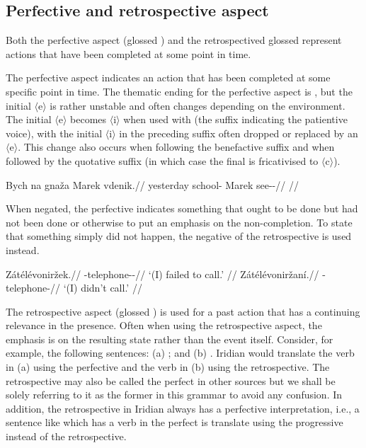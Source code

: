 \subsection{Perfective and retrospective aspect}\label{sec:perfective-retrospective}

Both the perfective aspect (glossed \Pf{}) and the retrospectived {glossed \Ret{}} represent actions that have been completed at some point in time.

The perfective aspect indicates an action that has been completed at some specific point in time. The thematic ending for the perfective aspect is , but the initial $\langle$e$\rangle$ is rather unstable and often changes depending on the environment. The initial $\langle$e$\rangle$ becomes $\langle$i$\rangle$ when used with  (the suffix indicating the patientive voice), with the initial $\langle$i$\rangle$ in the preceding suffix often dropped or replaced by an $\langle$e$\rangle$. This change also occurs when following the benefactive suffix  and when followed by the quotative suffix  (in which case the final  is fricativised to $\langle$c$\rangle$).

\pex
\begingl
\gla Bych na gnaža Marek vdenik.//
\glb yesterday \Loc{} school-\Acc{} Marek see-\Pv{}-\Pf{}//
\glft {}//
\endgl
\xe

When negated, the perfective indicates something that ought to be done but had not been done or otherwise to put an emphasis on the non-completion. To state that something simply did not happen, the negative of the retrospective is used instead.

\begin{multicols}{2}
\pex
\a\begingl
\gla Zátélévoniržek.//
\glb \Neg{}-telephone-\Av{}-\Pf{}//
\glft `(I) failed to call.' //
\endgl
\a\begingl
\gla Zátélévoniržaní.//
\glb \Neg{}-telephone-//
\glft `(I) didn't call.' //
\endgl
\xe
\end{multicols}

\par The retrospective aspect (glossed ) is used for a past action that has a continuing relevance in the presence. Often when using the retrospective aspect, the emphasis is on the resulting state rather than the event itself. Consider, for example, the following sentences: (a) ; and (b) . Iridian would translate the verb in (a) using the perfective and the verb in (b) using the retrospective. The retrospective may also be called the {\sc perfect} in other sources but we shall be solely referring to it as the former in this grammar to avoid any confusion. In addition, the retrospective in Iridian always has a perfective interpretation, i.e., a sentence like  which has a verb in the perfect is translate using the progressive instead of the retrospective.


